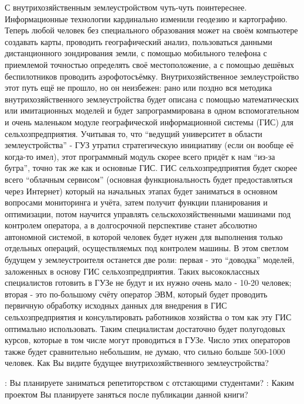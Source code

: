 \begin{drama}
С внутрихозяйственным землеустройством чуть-чуть поинтереснее. Информационные технологии кардинально изменили геодезию и картографию. Теперь любой человек без специального образования может на своём компьютере создавать карты, проводить географический анализ, пользоваться данными дистанционного зондирования земли, с помощью мобильного телефона с приемлемой точностью определять своё местоположение, а с помощью дешёвых беспилотников проводить аэрофотосъёмку. Внутрихозяйственное землеустройство этот путь ещё не прошло, но он неизбежен: рано или поздно вся методика внутрихозяйственного землеустройства будет описана с помощью математических или имитационных моделей и будет запрограммирована в одном вспомогательном и очень маленьком модуле географической информационной системы (ГИС) для сельхозпредприятия. Учитывая то, что “ведущий университет в области землеустройства” - ГУЗ утратил стратегическую инициативу (если он вообще её когда-то имел), этот программный модуль скорее всего придёт к нам “из-за бугра”, точно так же как и основные ГИС. 
ГИС сельхозпредприятия будет скорее всего “облачным сервисом” (основная функциональность будет предоставляться через Интернет) который на начальных этапах будет заниматься в основном вопросами мониторинга и учёта, затем получит функции планирования и оптимизации, потом научится управлять сельскохозяйственными машинами под контролем оператора, а в долгосрочной перспективе станет абсолютно автономной системой, в которой человек будет нужен для  выполнения только отдельных операций, осуществляемых под контролем машины. В этом светлом будущем у землеустроителя останется две роли: 
первая - это “доводка” моделей, заложенных в основу ГИС сельхозпредприятия. Таких высококлассных специалистов готовить в ГУЗе не будут и их нужно очень мало - 10-20 человек; 
вторая - это по-большому счёту оператор ЭВМ, который будет проводить первичную обработку исходных данных для внедрения в ГИС сельхозпредприятия и консультировать работников хозяйства о том как эту ГИС оптимально использовать. Таким специалистам достаточно будет полугодовых курсов, которые в том числе могут проводиться в ГУЗе. Число этих операторов также будет сравнительно небольшим, не думаю, что сильно больше 500-1000 человек.
Как Вы видите будущее внутрихозяйственного землеустройства?

	\maxspeaks: Вы планируете заниматься репетиторством с отстающими студентами?
	\maxspeaks: Каким проектом Вы планируете заняться после публикации данной книги?
\end{drama}